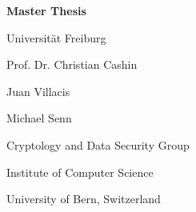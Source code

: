 {\begin{titlepage}
\begin{center}
    \vspace{0.3in} 
    \LARGE{\textbf{Master Thesis} \\}
    \vspace{0.4in}

    {\Large \thesisauthor}
    
    \vspace{0.3in}
    {\Large Universität Freiburg \par}

    
    
    \vfill
    {\Large \thesisdate \par}

     \vspace{0.6in}

    {\large
     Prof. Dr. Christian Cashin \par
     Juan Villacis \par
     Michael Senn
     
     
    }

    \vspace{0.3in}

    {\large
    Cryptology and Data Security Group \par
    Institute of Computer Science \par
    University of Bern, Switzerland \par
    }
  

  \vspace{0.9in}
 

\end{center}
\end{titlepage}}
